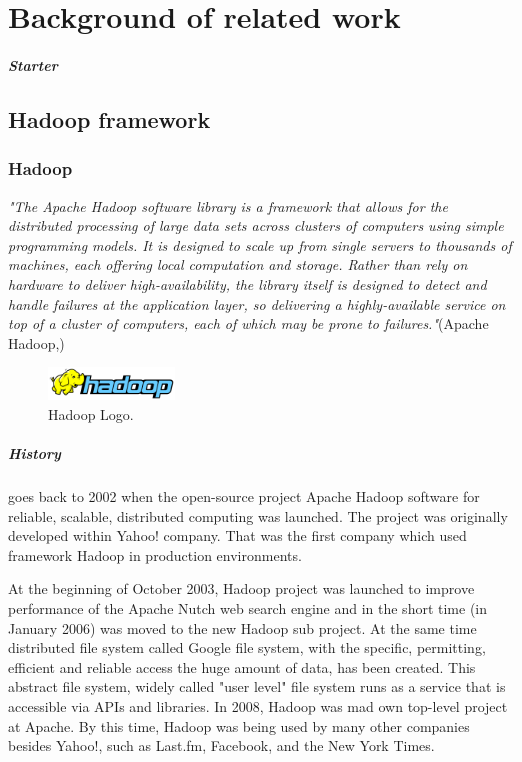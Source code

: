 \documentclass[a4paper,12pt,oneside]{report}
\begin{document}
 



\newpage
\chapter*{Background of related work}
\paragraph*{Starter}

\section{Hadoop framework}
\label{sec:hadoop}
		\subsection*{Hadoop}
		\emph{"The Apache Hadoop software library is a framework that allows for the distributed
		  processing of large data sets across clusters of computers using simple programming 
		  models. It is designed to scale up from single servers to 
		 thousands of machines, each offering local computation and storage. Rather than rely 
		 on hardware to deliver high-availability, the library itself is
		  designed to detect and handle failures at the application layer, so delivering a 
		  highly-available service on top of a cluster of computers,
		  each of which may be prone to failures."}(Apache Hadoop,\cite{hadoop_web})
 \begin{figure}[!htbp]
    \centering
    \includegraphics[width=0.3\textwidth]{./img/664px-Hadoop_logo.png}
    \caption[Hadoop architecture2]{\centering Hadoop Logo.}
 \end{figure}
		
		\paragraph*{History}goes back to 2002 when the 
open-source project Apache Hadoop software for reliable, scalable,
distributed computing was launched. The project was originally
developed within Yahoo! company. That was the first company
which used framework Hadoop in production environments.

 
At the beginning of October 2003, Hadoop project was launched to improve performance
of the Apache Nutch\cite{nutch_web} web search engine and in the short time (in January 2006) was moved to the new Hadoop sub project.
At the same time  distributed file system called Google
file system\cite{google_fs}, with the specific, permitting, efficient and reliable access
the huge amount of data, has been created. This abstract file system, widely called "user level"
file system runs as a service that is accessible via APIs and libraries. 
In 2008, Hadoop was mad own top-level project at Apache.\cite{hadoop_web_news} By this time, Hadoop was being used by many
other companies besides Yahoo!, such as Last.fm, Facebook, and the New York Times. 
\end{document}

